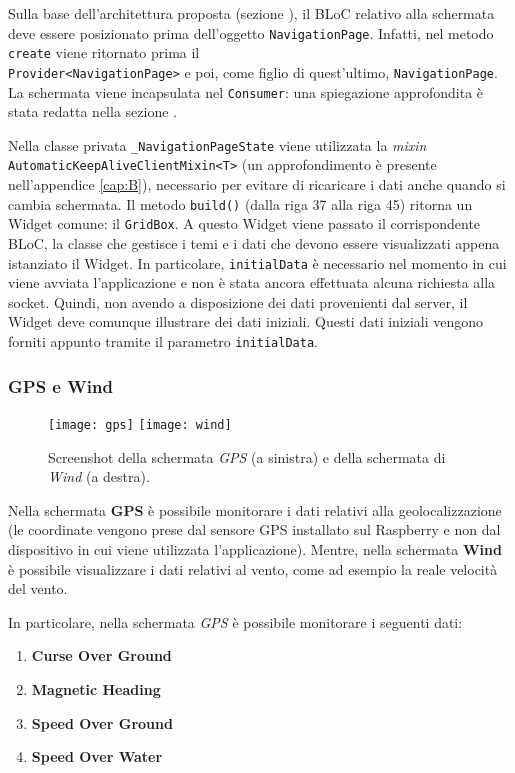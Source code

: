 Sulla base dell'architettura proposta (sezione \textit{}), il BLoC relativo alla schermata deve essere posizionato prima dell'oggetto \verb|NavigationPage|. Infatti, nel metodo \verb|create| viene ritornato prima il\\ \verb|Provider<NavigationPage>| e poi, come figlio di quest'ultimo, \verb|NavigationPage|. La schermata viene incapsulata nel \verb|Consumer|: una spiegazione approfondita è stata redatta nella sezione \textit{}.

Nella classe privata \verb|_NavigationPageState| viene utilizzata la \textit{mixin}\\ \verb|AutomaticKeepAliveClientMixin<T>| (un approfondimento è presente nell'appendice \ref{cap:B}), necessario per evitare di ricaricare i dati anche quando si cambia schermata. Il metodo \verb|build()| (dalla riga 37 alla riga 45) ritorna un Widget comune: il \verb|GridBox|. A questo Widget viene passato il corrispondente BLoC, la classe che gestisce i temi e i dati che devono essere visualizzati appena istanziato il Widget. In particolare, \verb|initialData| è necessario nel momento in cui viene avviata l'applicazione e non è stata ancora effettuata alcuna richiesta alla socket. Quindi, non avendo a disposizione dei dati provenienti dal server, il Widget deve comunque illustrare dei dati iniziali. Questi dati iniziali vengono forniti appunto tramite il parametro \verb|initialData|.

\newpage

\subsubsection{GPS e Wind}
\begin{figure}[htp]
	\centering
	\texttt{[image: gps]}
	\texttt{[image: wind]}
	\caption[Screenshot - Drawer e della schermata Settings]{Screenshot della schermata \textit{GPS} (a sinistra) e della schermata di \textit{Wind} (a destra).}\label{xyz}
\end{figure}

Nella schermata \textbf{GPS} è possibile monitorare i dati relativi alla geolocalizzazione (le coordinate vengono prese dal sensore GPS installato sul Raspberry e non dal dispositivo in cui viene utilizzata l'applicazione). Mentre, nella schermata \textbf{Wind} è possibile visualizzare i dati relativi al vento, come ad esempio la reale velocità del vento.

In particolare, nella schermata \textit{GPS} è possibile monitorare i seguenti dati:
\begin{enumerate}
	\item \textbf{Curse Over Ground}
	\item \textbf{Magnetic Heading}
	\item \textbf{Speed Over Ground}
	\item \textbf{Speed Over Water}
\end{enumerate}

